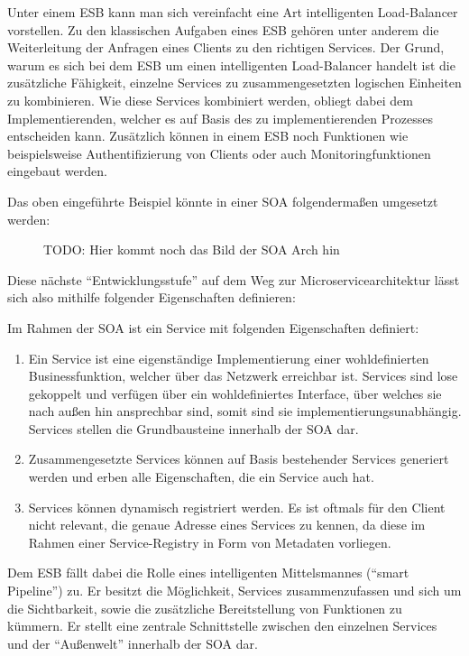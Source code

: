 Unter einem \ac{ESB} kann man sich vereinfacht eine Art intelligenten Load-Balancer vorstellen. Zu den klassischen Aufgaben eines \ac{ESB} gehören unter anderem die Weiterleitung der Anfragen eines Clients zu den richtigen Services. Der Grund, warum es sich bei dem \ac{ESB} um einen intelligenten Load-Balancer handelt ist die zusätzliche Fähigkeit, einzelne Services zu zusammengesetzten logischen Einheiten zu kombinieren. Wie diese Services kombiniert werden, obliegt dabei dem Implementierenden, welcher es auf Basis des zu implementierenden Prozesses entscheiden kann. Zusätzlich können in einem \ac{ESB} noch Funktionen wie beispielsweise Authentifizierung von Clients oder auch Monitoringfunktionen eingebaut werden.

Das oben eingeführte Beispiel könnte in einer \ac{SOA} folgendermaßen umgesetzt werden:
\begin{figure}[h]
	\centering
	\caption{TODO: Hier kommt noch das Bild der SOA Arch hin}
\end{figure}

Diese nächste \enquote{Entwicklungsstufe} auf dem Weg zur Microservicearchitektur lässt sich also mithilfe folgender Eigenschaften definieren:

\begin{definition}
	Im Rahmen der \ac{SOA} ist ein Service mit folgenden Eigenschaften definiert: \autocite[S. 4]{microservice_enterprise}
	\begin{enumerate}
		\item Ein Service ist eine eigenständige Implementierung einer wohldefinierten Businessfunktion, welcher über das Netzwerk erreichbar ist. Services sind lose gekoppelt und verfügen über ein wohldefiniertes Interface, über welches sie nach außen hin ansprechbar sind, somit sind sie implementierungsunabhängig. Services stellen die Grundbausteine innerhalb der \ac{SOA} dar.
		\item Zusammengesetzte Services können auf Basis bestehender Services generiert werden und erben alle Eigenschaften, die ein Service auch hat.
		\item Services können dynamisch registriert werden. Es ist oftmals für den Client nicht relevant, die genaue Adresse eines Services zu kennen, da diese im Rahmen einer Service-Registry in Form von Metadaten vorliegen.
	\end{enumerate}
	Dem \ac{ESB} fällt dabei die Rolle eines intelligenten Mittelsmannes (\enquote{smart Pipeline}) zu. Er besitzt die Möglichkeit, Services zusammenzufassen und sich um die Sichtbarkeit, sowie die zusätzliche Bereitstellung von Funktionen zu kümmern. Er stellt eine zentrale Schnittstelle zwischen den einzelnen Services und der \enquote{Außenwelt} innerhalb der \ac{SOA} dar.
\end{definition}

